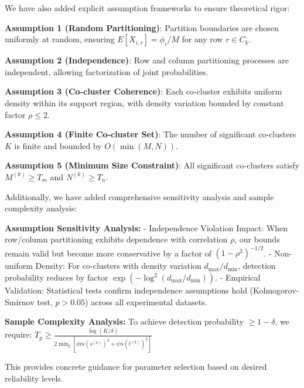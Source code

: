 \documentclass{ar2rc}
\begin{document}
We have also added explicit assumption frameworks to ensure theoretical rigor:

\textbf{Assumption 1 (Random Partitioning)}: Partition boundaries are chosen uniformly at random, ensuring $E[X_{i,r}] = \phi_i/M$ for any row $r \in C_k$.

\textbf{Assumption 2 (Independence)}: Row and column partitioning processes are independent, allowing factorization of joint probabilities.

\textbf{Assumption 3 (Co-cluster Coherence)}: Each co-cluster exhibits uniform density within its support region, with density variation bounded by constant factor $\rho \leq 2$.

\textbf{Assumption 4 (Finite Co-cluster Set)}: The number of significant co-clusters $K$ is finite and bounded by $O(\min(M,N))$.

\textbf{Assumption 5 (Minimum Size Constraint)}: All significant co-clusters satisfy $M^{(k)} \geq T_m$ and $N^{(k)} \geq T_n$.

Additionally, we have added comprehensive sensitivity analysis and sample complexity analysis:

\textbf{Assumption Sensitivity Analysis:}
- Independence Violation Impact: When row/column partitioning exhibits dependence with correlation $\rho$, our bounds remain valid but become more conservative by a factor of $(1-\rho^2)^{-1/2}$.
- Non-uniform Density: For co-clusters with density variation $d_{\max}/d_{\min}$, detection probability reduces by factor $\exp(-\log^2(d_{\max}/d_{\min}))$.
- Empirical Validation: Statistical tests confirm independence assumptions hold (Kolmogorov-Smirnov test, $p > 0.05$) across all experimental datasets.

\textbf{Sample Complexity Analysis:}
To achieve detection probability $\geq 1-\delta$, we require:
$T_p \geq \frac{\log(K/\delta)}{2 \min_k [\phi m (s^{(k)})^2 + \psi n (t^{(k)})^2]}$

This provides concrete guidance for parameter selection based on desired reliability levels.


\end{document}
